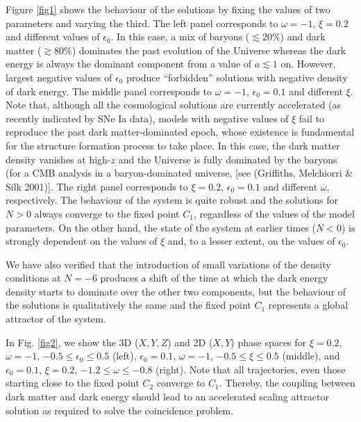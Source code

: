\documentclass[twocolumn,preprintnumbers,amsmath,amssymb]{revtex4}
\begin{document}
Figure \ref{fig1} shows the behaviour of the solutions by fixing the values
of two parameters and varying the third. The left panel corresponds
to $\omega=-1$, $\xi=0.2$ and different values of $\epsilon_{0}$. In this case, a mix of baryons 
($\lesssim 20\%$) and dark matter ($\gtrsim 80\%$) dominates the past evolution of the Universe whereas the 
dark energy is always the dominant component
from a value of $a \lesssim 1$ on. However, largest negative values of 
$\epsilon_{0}$ produce \textquotedblleft{}forbidden\textquotedblright{} solutions with negative density of dark energy. 
The middle panel corresponds to $\omega=-1$, $\epsilon_{0}=0.1$ and different $\xi$. Note that, although all the 
cosmological solutions are currently accelerated (as recently indicated by SNe Ia data), models with negative 
values of $\xi$ fail to reproduce the past dark matter-dominated epoch, whose existence is fundamental for the 
structure formation process to take place. In this case, the dark matter density vanishes at high-$z$ and the 
Universe is fully dominated by the baryons (for a CMB analysis in a baryon-dominated universe, [see (Griffiths, Melchiorri \& Silk 2001)].
The right panel corresponds to $\xi=0.2$, $\epsilon_{0}=0.1$ and different $\omega$, respectively. The behaviour 
of the system
is quite robust and the solutions for $N>0$ always converge to the fixed point $C_{1}$, regardless of the values 
of the model parameters. On the other hand, the state of the system at earlier times ($N<0$) is strongly dependent 
on the values of $\xi$ and, to a lesser extent, on the values of $\epsilon_{0}$. 

We have also verified that the introduction of small variations of the density conditions at $N=-6$ produces a shift 
of the time at which the dark energy density
starts to dominate over the other two components, but the behaviour of the solutions is qualitatively the same and the 
fixed point $C_{1}$ represents a global attractor of the system. 

In Fig. \ref{fig2}, we show the 3D ($X,Y,Z$) and 2D ($X,Y$) phase spaces for $\xi=0.2$, $\omega=-1$, 
$-0.5\leq\epsilon_{0}\leq0.5$ (left),
$\epsilon_{0}=0.1$, $\omega=-1$, $-0.5\leq\xi\leq0.5$ (middle),
and $\epsilon_{0}=0.1$, $\xi=0.2$, $-1.2\leq\omega\leq-0.8$ (right).
Note that all trajectories, even those starting close to the fixed
point $C_{2}$ converge to $C_{1}$. Thereby, the coupling between dark matter and dark energy should lead to 
an accelerated scaling attractor solution as required to solve the coincidence problem.
\end{document}
